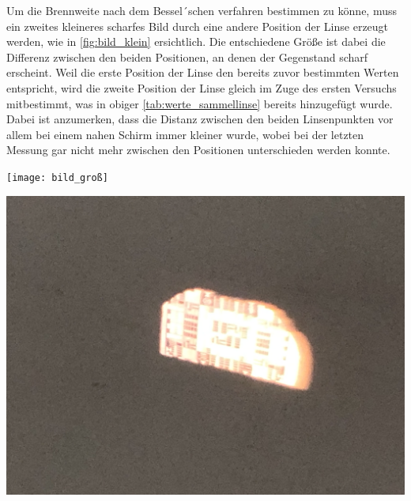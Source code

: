 \documentclass[11pt,ngerman]{scrartcl}
\begin{document}
Um die Brennweite nach dem Bessel´schen verfahren bestimmen zu könne, muss ein zweites kleineres scharfes Bild durch eine andere Position der Linse erzeugt werden, wie in \autoref{fig:bild_klein} ersichtlich. Die entschiedene Größe ist dabei die Differenz zwischen den beiden Positionen, an denen der Gegenstand scharf erscheint. Weil die erste Position der Linse den bereits zuvor bestimmten Werten entspricht, wird die zweite Position der Linse gleich im Zuge des ersten Versuchs mitbestimmt, was in obiger \autoref{tab:werte_sammellinse} bereits hinzugefügt wurde. Dabei ist anzumerken, dass die Distanz zwischen den beiden Linsenpunkten vor allem bei einem nahen Schirm immer kleiner wurde, wobei bei der letzten Messung gar nicht mehr zwischen den Positionen unterschieden werden konnte.

\vspace{2mm}

\begin{minipage}{\textwidth}
	\begin{minipage}[t]{0.5\textwidth}
		\centering
		\texttt{[image: bild\_groß]}
		\label{fig:bild_groß}
	\end{minipage}
	\vspace{2mm}
	\begin{minipage}[t]{0.50\textwidth}
		\centering
		\includegraphics[width=\textwidth]{bild_klein}
		\label{fig:bild_klein}
	\end{minipage}
	\vspace{1em}
\end{minipage}
\end{document}
